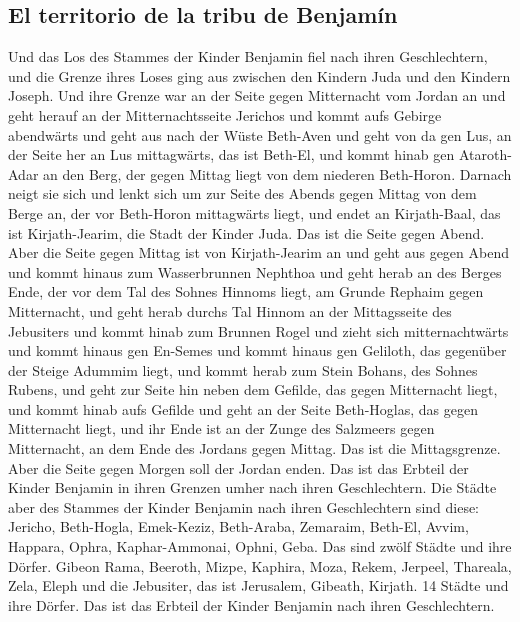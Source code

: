 \hypertarget{el-territorio-de-la-tribu-de-benjamuxedn}{%
\subsection{El territorio de la tribu de
Benjamín}\label{el-territorio-de-la-tribu-de-benjamuxedn}}

 Und das Los des Stammes der Kinder Benjamin fiel nach
ihren Geschlechtern, und die Grenze ihres Loses ging aus zwischen den
Kindern Juda und den Kindern Joseph.  Und ihre Grenze war
an der Seite gegen Mitternacht vom Jordan an und geht herauf an der
Mitternachtsseite Jerichos und kommt aufs Gebirge abendwärts und geht
aus nach der Wüste Beth-Aven  und geht von da gen Lus, an
der Seite her an Lus mittagwärts, das ist Beth-El, und kommt hinab gen
Ataroth-Adar an den Berg, der gegen Mittag liegt von dem niederen
Beth-Horon.  Darnach neigt sie sich und lenkt sich um zur
Seite des Abends gegen Mittag von dem Berge an, der vor Beth-Horon
mittagwärts liegt, und endet an Kirjath-Baal, das ist Kirjath-Jearim,
die Stadt der Kinder Juda. Das ist die Seite gegen Abend.
 Aber die Seite gegen Mittag ist von Kirjath-Jearim an
und geht aus gegen Abend und kommt hinaus zum Wasserbrunnen Nephthoa
 und geht herab an des Berges Ende, der vor dem Tal des
Sohnes Hinnoms liegt, am Grunde Rephaim gegen Mitternacht, und geht
herab durchs Tal Hinnom an der Mittagsseite des Jebusiters und kommt
hinab zum Brunnen Rogel  und zieht sich mitternachtwärts
und kommt hinaus gen En-Semes und kommt hinaus gen Geliloth, das
gegenüber der Steige Adummim liegt, und kommt herab zum Stein Bohans,
des Sohnes Rubens,  und geht zur Seite hin neben dem
Gefilde, das gegen Mitternacht liegt, und kommt hinab aufs Gefilde
 und geht an der Seite Beth-Hoglas, das gegen Mitternacht
liegt, und ihr Ende ist an der Zunge des Salzmeers gegen Mitternacht, an
dem Ende des Jordans gegen Mittag. Das ist die Mittagsgrenze.
 Aber die Seite gegen Morgen soll der Jordan enden. Das
ist das Erbteil der Kinder Benjamin in ihren Grenzen umher nach ihren
Geschlechtern.  Die Städte aber des Stammes der Kinder
Benjamin nach ihren Geschlechtern sind diese: Jericho, Beth-Hogla,
Emek-Keziz,  Beth-Araba, Zemaraim, Beth-El,
 Avvim, Happara, Ophra,  Kaphar-Ammonai,
Ophni, Geba. Das sind zwölf Städte und ihre Dörfer. 
Gibeon Rama, Beeroth,  Mizpe, Kaphira, Moza,
 Rekem, Jerpeel, Thareala,  Zela, Eleph
und die Jebusiter, das ist Jerusalem, Gibeath, Kirjath. 14 Städte und
ihre Dörfer. Das ist das Erbteil der Kinder Benjamin nach ihren
Geschlechtern.

